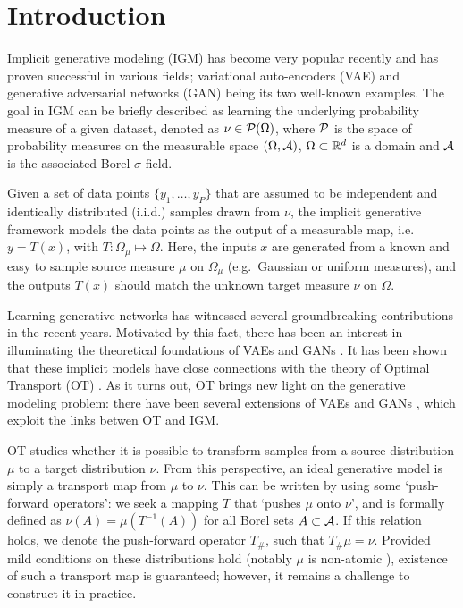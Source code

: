 
\section{Introduction}


Implicit generative modeling (IGM) \cite{diggle1984monte, mohamed2016learning} has become very popular recently and has proven
successful in various fields; variational auto-encoders (VAE) \cite{kingma2013VAE} and generative adversarial networks (GAN) \cite{goodfellow2014generative} being its two well-known examples. The goal in IGM can be briefly described as learning the
underlying probability measure of a given dataset, denoted as $\nu \in {\cal P}(\Omega)$, where ${\cal P}$ is the space of probability measures on the measurable space $(\Omega,\mathcal{A})$, $\Omega \subset \mathbb{R}^d$ is a domain and $\mathcal{A}$ is the associated Borel $\sigma$-field.

Given a set of data points $\{y_1 , \dots , y_P \}$ that are assumed to be independent and identically distributed (i.i.d.) samples drawn from $\nu$, the implicit generative framework models the data points as the output of a measurable map, i.e.\ $y = T(x)$, with $T: \Omega_\mu \mapsto \Omega$. Here, the inputs $x$ are generated from a known and easy to sample source measure $\mu$ on $\Omega_\mu$ (e.g.\ Gaussian or uniform measures), and the outputs $T(x)$ should match the unknown target measure $\nu$ on $\Omega$.




Learning generative networks has witnessed several groundbreaking contributions in the recent years. Motivated by this fact, there has been an interest in illuminating the theoretical foundations of VAEs and GANs \cite{bousquet2017optimal,liu2017approximation}.
%
It has been shown that these implicit models have close connections with the theory of Optimal Transport (OT) \cite{villani2008optimal}.
%
As it turns out, OT brings new light on the generative modeling problem: there have been several extensions of VAEs \cite{tolstikhin2017wasserstein,kolouri2018sliced} and GANs \cite{arjovsky2017wasserstein,gulrajani2017improved,guo2017relaxed,lei2017geometric}, which exploit the links betwen OT and IGM.


OT studies whether it is possible to transform samples from a source distribution $\mu$ to a target distribution $\nu$. From this perspective, an ideal generative model is simply a transport map from $\mu$ to $\nu$.
This can be written by using some `push-forward operators': we seek a mapping $T$ that `pushes $\mu$ onto $\nu$', and is formally defined as $ \nu(A) =  \mu(T^{-1}(A)) $ for all Borel sets $A \subset \mathcal{A}$. If this relation holds, we denote the push-forward operator $T_\#$, such that $T_\# \mu = \nu$. Provided mild conditions on these distributions hold (notably $\mu$ is non-atomic \cite{villani2008optimal}), existence of such a transport map is guaranteed; however, it remains a challenge to construct it in practice.

